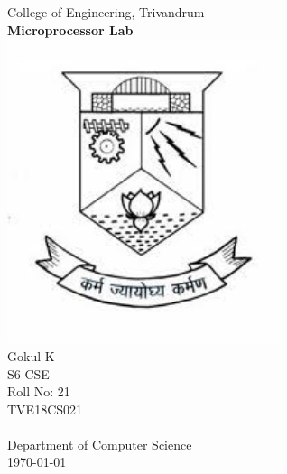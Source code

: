 \documentclass{article}
\begin{document}
\begin{titlepage}
	\begin{center}
		{\LARGE College of Engineering, Trivandrum}\\[3cm]
		\linespread{1.2}\huge {\bfseries Microprocessor Lab}\\[3cm]
		\linespread{1}
		\includegraphics[width=8cm]{img/emblem.jpeg}\\[1cm]
		{\Large Gokul K\\ S6 CSE \\ Roll No: 21\\ TVE18CS021 }\\[1cm]
		\textit{ }\\[1cm]
		{\LARGE 
			Department of Computer Science\\[0.2cm]
			\today 
		}
	\end{center}
	
\end{titlepage}
\large

\newpage
\setlength{\headheight}{15.2pt}
\pagestyle{fancy}
\fancyhf{}
\fancyhead[RO]{\fontsize{12}{12}\selectfont\nouppercase\leftmark} 
\fancyhead[LO]{\fontsize{9}{12}\selectfont\nouppercase\rightmark} 


\end{document}
